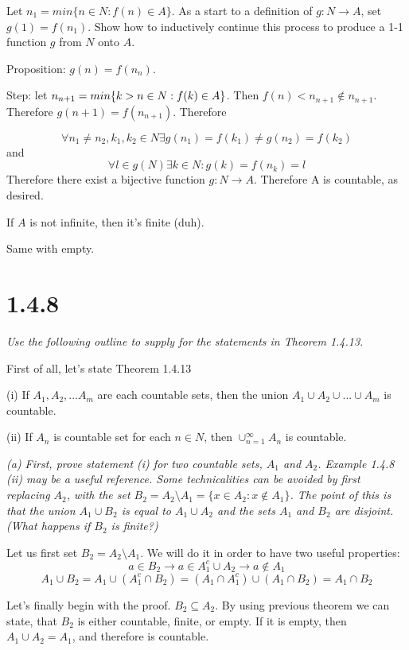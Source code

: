 \documentclass[11pt,oneside,titlepage]{article}
\begin{document}
Let $n_1 = min\{n \in N: f(n) \in A\}$. As a start to a definition of
$g: N \to A$, set $g(1) = f(n_1)$. Show how to inductively continue this
process to produce a 1-1 function $g$ from $N$ onto $A$.

Proposition: $g(n) = f(n_n)$.

Step: let $n_{n + 1} = min\{k > n \in N: f(k) \in A\text\}$. Then $f(n) <
n_{n+ 1} \notin n_{n + 1}$. Therefore $g(n + 1) = f(n_{n + 1})$. Therefore

$$\forall n_1 \neq n_2, k_1, k_2 \in N \exists g(n_1) = f(k_1)  \neq g(n_2) =
f(k_2)$$
and
$$\forall l \in g(N) \exists k \in N: g(k) = f(n_k) = l$$
Therefore there exist a bijective function $g: N \to A$. Therefore A is
countable, as desired.

If $A$ is not infinite, then it's finite (duh).

Same with empty.

\section*{1.4.8}
\textit{Use the following outline to supply for the statements in Theorem
  1.4.13.}

First of all, let's state Theorem 1.4.13

(i) If $A_1, A_2,...A_m$ are each countable sets, then the union
$A_1 \cup A_2 \cup ... \cup A_m$ is countable.

(ii) If $A_n$ is countable set for each $n \in N$, then $\cup^{\infty}_{n = 1}
A_n$ is countable.

\textit{(a) First, prove statement (i) for two countable sets, $A_1$ and $A_2$.
  Example 1.4.8 (ii) may be a useful reference. Some technicalities can be
  avoided by first replacing $A_2$, with the set $B_2 = A_2 \setminus A_1
  = \{x \in A_2: x \notin A_1\}$. The point of this is that the union
  $A_1 \cup B_2$ is equal to $A_1 \cup A_2$ and the sets $A_1$ and $B_2$ are
  disjoint. (What happens if $B_2$ is finite?)}

Let us first set $B_2 = A_2 \setminus A_1$. We will do it in order to have two
useful properties:
$$a \in B_2 \to a \in A_1^c \cup A_2 \to a \notin A_1$$
$$A_1 \cup B_2 = A_1 \cup (A_1^c \cap B_2) = (A_1 \cap A_1^c) \cup (A_1 \cap
B_2) = A_1 \cap B_2$$

Let's finally begin with the proof.  $B_2 \subseteq A_2$. By using
previous theorem we can state, that $B_2$ is either countable, finite, or
empty. If it is empty, then $A_1 \cup A_2 = A_1$, and therefore is countable.
\end{document}
